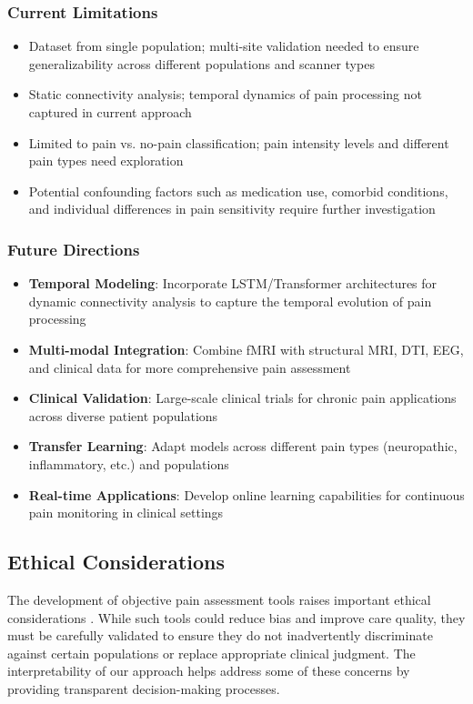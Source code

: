 \documentclass[10pt,journal,compsoc]{IEEEtran}
\begin{document}
\subsubsection{Current Limitations}
\begin{itemize}
\item Dataset from single population; multi-site validation needed to ensure generalizability across different populations and scanner types
\item Static connectivity analysis; temporal dynamics of pain processing not captured in current approach
\item Limited to pain vs. no-pain classification; pain intensity levels and different pain types need exploration
\item Potential confounding factors such as medication use, comorbid conditions, and individual differences in pain sensitivity require further investigation
\end{itemize}

\subsubsection{Future Directions}
\begin{itemize}
\item \textbf{Temporal Modeling}: Incorporate LSTM/Transformer architectures for dynamic connectivity analysis to capture the temporal evolution of pain processing
\item \textbf{Multi-modal Integration}: Combine fMRI with structural MRI, DTI, EEG, and clinical data for more comprehensive pain assessment
\item \textbf{Clinical Validation}: Large-scale clinical trials for chronic pain applications across diverse patient populations
\item \textbf{Transfer Learning}: Adapt models across different pain types (neuropathic, inflammatory, etc.) and populations
\item \textbf{Real-time Applications}: Develop online learning capabilities for continuous pain monitoring in clinical settings
\end{itemize}

\subsection{Ethical Considerations}

The development of objective pain assessment tools raises important ethical considerations \cite{char2018implementing,topol2019high}. While such tools could reduce bias and improve care quality, they must be carefully validated to ensure they do not inadvertently discriminate against certain populations or replace appropriate clinical judgment. The interpretability of our approach helps address some of these concerns by providing transparent decision-making processes.
\end{document}
